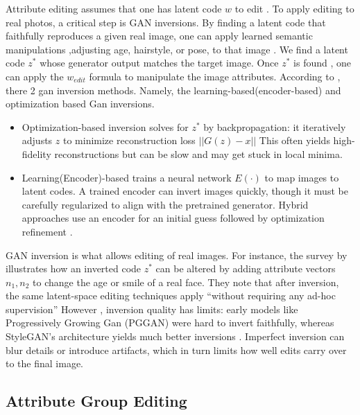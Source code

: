 Attribute editing assumes that one has latent code $w$ to edit . To apply editing to real photos, a critical step is GAN inversions. 
By finding a latent code that faithfully reproduces a given real image, one can apply learned semantic manipulations 
,adjusting age, hairstyle, or pose, to that image \citep{bobkov2024devildetailsstylefeatureeditordetailrich,alaluf2021restyleresidualbasedstyleganencoder}.
We find a latent code $z^*$ whose generator output matches the target image. Once $z^*$ is found , one can apply
the $w_{edit}$ formula to manipulate the image attributes.
According to \citet{xia2022ganinversionsurvey}, there 2 gan inversion methods. Namely, the learning-based(encoder-based) and optimization based Gan inversions.
\begin{itemize}
    \item Optimization-based inversion solves for $z^*$ by backpropagation: it iteratively adjusts $z$ to minimize reconstruction loss $||G(z)-x||$ This often yields high-fidelity reconstructions but can be slow and may get stuck in local minima.
    \item Learning(Encoder)-based trains a neural network $E(\cdot)$ to map images to latent codes. A trained encoder can invert images quickly, though it must be carefully regularized to align with the pretrained generator. Hybrid approaches use an encoder for an initial guess followed by optimization refinement \citep{xia2022ganinversionsurvey}.
\end{itemize}

GAN inversion is what allows editing of real images. For instance, the survey by \citet{xia2022ganinversionsurvey} 
illustrates how an inverted code $z^*$ can be altered by adding attribute vectors  $n_1,n_2$ to change the age or smile of a real face.
They note that after inversion, the same latent-space editing techniques apply “without requiring any ad-hoc supervision”
However , inversion quality has limits: early models like Progressively Growing Gan (PGGAN)\citep{karras2018progressivegrowinggansimproved} were hard to invert faithfully,
whereas StyleGAN's architecture yields much better inversions \citep{karras2020analyzingimprovingimagequality}. 
Imperfect inversion can blur details or introduce artifacts, which in turn limits how well edits carry over to the final image.

\subsection{Attribute Group Editing}

